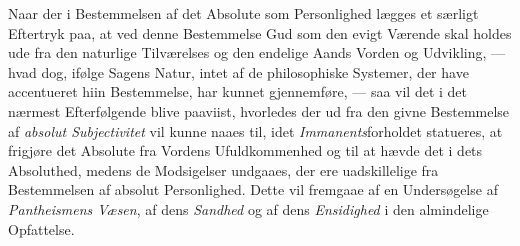 Naar der i Bestemmelsen af det Absolute som Personlighed lægges et særligt
Eftertryk paa, at ved denne Bestemmelse Gud som den evigt Værende skal holdes
ude fra den naturlige Tilværelses og den endelige Aands Vorden og Udvikling,
--- hvad dog, ifølge Sagens Natur, intet af de philosophiske Systemer, der have
accentueret hiin Bestemmelse, har kunnet gjennemføre, --- saa vil det i det
nærmest Efterfølgende blive paaviist, hvorledes der ud fra den givne
Bestemmelse af \emph{absolut Subjectivitet} vil kunne naaes til, idet
\emph{Immanents}forholdet statueres, at frigjøre det Absolute fra Vordens
Ufuldkommenhed og til at hævde det i dets Absoluthed, medens de Modsigelser
undgaaes, der ere uadskillelige fra Bestemmelsen af absolut Personlighed. Dette
vil fremgaae af en Undersøgelse af \emph{Pantheismens Væsen}, af dens
\emph{Sandhed} og af dens \emph{Ensidighed} i den almindelige Opfattelse.

